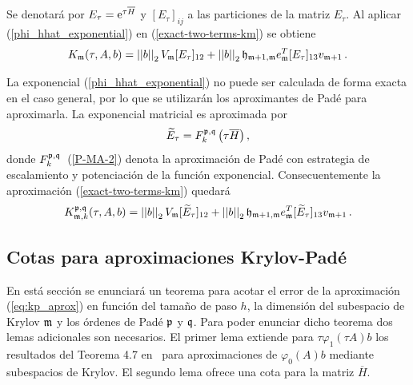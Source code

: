 Se denotará por $E_\tau = \mathrm{e}^{\tau \overline{H} }$ y $[E_\tau]_{ij}$ a las particiones de la matriz $E_\tau$. Al aplicar (\ref{phi_hhat_exponential}) en (\ref{exact-two-terms-km}) se obtiene
\begin{equation*}
    K_{\mathfrak{m}}(\tau,A,b) = \left\lvert \left\lvert  b  \right\rvert \right\rvert_2V_{\mathfrak{m}} [E_\tau]_{12} + \left\lvert \left\lvert  b  \right\rvert \right\rvert_2\mathfrak{h}_{\mathfrak{m}+1,\mathfrak{m}}e^T_{\mathfrak{m}}[E_\tau]_{13}v_{\mathfrak{m}+1} \, .
 \end{equation*}

La exponencial (\ref{phi_hhat_exponential}) no puede ser calculada de forma exacta en el caso general, por lo que se utilizarán los aproximantes de Padé para aproximarla. La exponencial matricial es aproximada por
\begin{equation*}
    \widetilde{E}_{\tau} = F_k^{\mathfrak{p},\mathfrak{q}}\left(\tau\overline{H}\right),
\end{equation*}
donde $F_k^{\mathfrak{p},\mathfrak{q}}$~(\ref{P-MA-2}) denota la aproximación de Padé con estrategia de escalamiento y potenciación de la función exponencial. Consecuentemente la aproximación (\ref{exact-two-terms-km}) quedará
\begin{equation} \label{eq:kp_aprox}
    K_{\mathfrak{m},k}^{\mathfrak{p},\mathfrak{q}}(\tau,A,b) = \left\lvert \left\lvert  b  \right\rvert \right\rvert_2V_{\mathfrak{m}} [\widetilde{E}_\tau]_{12} + \left\lvert \left\lvert  b  \right\rvert \right\rvert_2\mathfrak{h}_{\mathfrak{m}+1,\mathfrak{m}}e^T_{\mathfrak{m}}[\widetilde{E}_\tau]_{13}v_{\mathfrak{m}+1} \, .
 \end{equation}

 \subsection{Cotas para aproximaciones Krylov-Padé}
 En está sección se enunciará un teorema para acotar el error de la aproximación (\ref{eq:kp_aprox}) en función del tamaño de paso $h$, la dimensión del subespacio de Krylov $\mathfrak{m}$ y los órdenes de Padé $\mathfrak{p}$ y $\mathfrak{q}$. Para poder enunciar dicho teorema dos lemas adicionales son necesarios. El primer lema extiende para $\tau \varphi_1(\tau A)b$ los resultados del Teorema 4.7 en~\cite{Saad92} para aproximaciones de $\varphi_0(A)b$ mediante subespacios de Krylov. El segundo lema ofrece una cota para la matriz $\overline{H}$.

